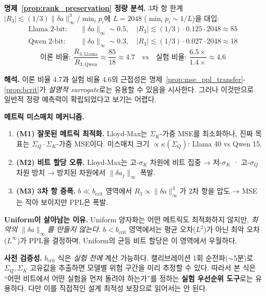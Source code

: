 \textbf{명제~\ref{prop:rank_preservation} 정량 분석.} 3차 항 한계 $|R_3| \lesssim (1/3) \lVert \delta a \rVert_\infty^3 / \min_i p_i$에 $L = 2048$ ($\min_i p_i \sim 1/L$)을 대입:
\begin{align*}
\text{Llama 2-bit:}\quad & \lVert \delta a \rVert_\infty \sim 0.5,\quad |R_3| \lesssim (1/3) \cdot 0.125 \cdot 2048 \approx 85 \\
\text{Qwen 2-bit:}\quad  & \lVert \delta a \rVert_\infty \sim 0.3,\quad |R_3| \lesssim (1/3) \cdot 0.027 \cdot 2048 \approx 18
\end{align*}
\begin{equation*}
\text{이론 비율: } \frac{R_{3,\text{Llama}}}{R_{3,\text{Qwen}}} \approx \frac{85}{18} \approx 4.7 \quad\text{vs}\quad \text{실험 비율: } \frac{6.5\times}{1.4\times} \approx 4.6
\end{equation*}

\textbf{해석.} 이론 비율 4.7과 실험 비율 4.6의 근접성은 명제~\ref{prop:mse_ppl_transfer}-\ref{prop:bcrit}가 \emph{설명적 surrogate}로는 유용할 수 있음을 시사한다. 그러나 이것만으로 일반적 정량 예측력이 확립되었다고 보기는 어렵다.

\textbf{메트릭 미스매치 메커니즘.}
\begin{enumerate}[leftmargin=1.5em,itemsep=2pt]
\item \textbf{(M1) 잘못된 메트릭 최적화.} Lloyd-Max는 $\Sigma_K$-가중 MSE를 최소화하나, 진짜 목표는 $\Sigma_Q \cdot \Sigma_K$-가중 MSE이다. 미스매치 크기 $\propto \kappa(\Sigma_Q)$: Llama 40 vs Qwen 15.
\item \textbf{(M2) 비트 할당 오류.} Lloyd-Max는 고-$\sigma_K$ 차원에 비트 집중 → 저-$\sigma_K$ · 고-$\sigma_Q$ 차원 방치 → 방치된 차원에서 $\lVert \delta a_j \rVert_\infty$ 폭발.
\item \textbf{(M3) 3차 항 증폭.} $b \ll b_{\mathrm{crit}}$ 영역에서 $R_3 \propto \lVert \delta a \rVert_\infty^3$가 2차 항을 압도 → MSE는 작아 보이지만 PPL은 폭발.
\end{enumerate}

\textbf{Uniform이 살아남는 이유.} Uniform 양자화는 어떤 메트릭도 최적화하지 않지만, \emph{최악의 $\lVert \delta a \rVert_\infty$를 만들지 않는다}. $b < b_{\mathrm{crit}}$ 영역에서는 평균 오차($L^2$)가 아닌 최악 오차($L^\infty$)가 PPL을 결정하며, Uniform의 균등 비트 할당은 이 영역에서 우월하다.

\textbf{사전 검증성.} $b_{\mathrm{crit}}$ 식은 \emph{실험 전에} 계산 가능하다. 캘리브레이션 1회 순전파($\sim$5분)로 $\Sigma_Q, \Sigma_K$ 고유값을 추출하면 모델별 위험 구간을 미리 추정할 수 있다. 따라서 본 식은 ``어떤 비트에서 어떤 실험을 먼저 돌려야 하는가''를 정하는 \textbf{실험 우선순위 도구}로는 유용하다. 다만 이를 직접적인 설계 최적성 보장으로 읽어서는 안 된다.
